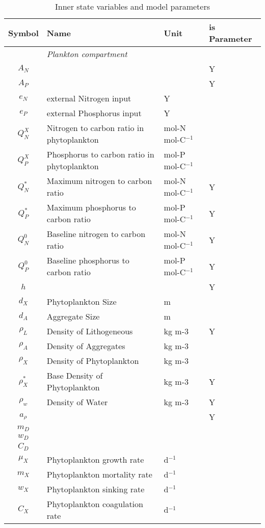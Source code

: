 \documentclass[fleqn]{article}                     %
\begin{document}
\begin{table*}[h]
  \centering
  \caption{Inner state variables and model parameters}
  \begin{tabular}{clll}
  \hline
    \textbf{Symbol} & \textbf{Name} & \textbf{Unit}& is Parameter \\ \hline
    & \emph{Plankton compartment} & \\
    $A_N$&&&Y\\
    $A_P$&&&Y\\
    $e_N$ & external Nitrogen input&Y\\
    $e_P$ & external Phosphorus input&Y \\
    $Q^X_N$ & Nitrogen to carbon ratio in phytoplankton & mol-N mol-C$^{-1}$ \\
    $Q^X_P$ & Phosphorus to carbon ratio in phytoplankton & mol-P mol-C$^{-1}$ \\
    $Q^*_N$ & Maximum nitrogen to carbon ratio & mol-N mol-C$^{-1}$ &Y\\
    $Q^*_P$ & Maximum phosphorus to carbon ratio & mol-P mol-C$^{-1}$ &Y\\
    $Q^0_N$ & Baseline nitrogen to carbon ratio & mol-N mol-C$^{-1}$ &Y\\
    $Q^0_P$ & Baseline phosphorus to carbon ratio & mol-P mol-C$^{-1}$ &Y\\
    $h$ & &&Y\\
    $d_X$&Phytoplankton Size& m &\\
    $d_A$&Aggregate Size& m &\\
    $\rho_L$& Density of Lithogeneous & kg m-3 & Y\\
    $\rho_A$& Density of Aggregates & kg m-3&\\
    $\rho_X$& Density of Phytoplankton & kg m-3 &\\
     $\rho^*_X$& Base Density of Phytoplankton & kg m-3 &Y\\
    $\rho_w$&Density of Water & kg m-3&Y\\
    $a_\rho$&&&Y\\
    $m_D$&\\
    $w_D$&\\
    $C_D$&\\
    $\mu_X$ & Phytoplankton growth rate & d$^{-1}$ \\
    $m_X$ & Phytoplankton mortality rate & d$^{-1}$ \\
    $w_X$ & Phytoplankton sinking rate & d$^{-1}$ \\
    $C_X$ & Phytoplankton coagulation rate & d$^{-1}$ \\

\end{tabular}
\end{table*}
\end{document}
